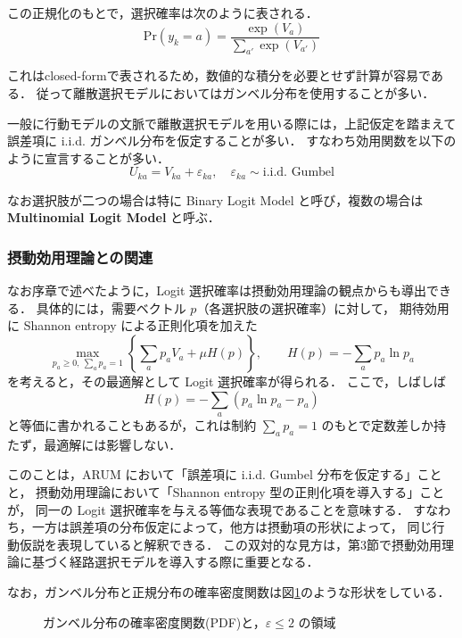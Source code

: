 この正規化のもとで，選択確率は次のように表される．
\begin{equation}
  \text{Pr}(y_k = a) = \frac{\exp(V_a)}{\sum_{a'} \exp(V_{a'})}
\end{equation}

これはclosed-formで表されるため，数値的な積分を必要とせず計算が容易である．
従って離散選択モデルにおいてはガンベル分布を使用することが多い．

一般に行動モデルの文脈で離散選択モデルを用いる際には，上記仮定を踏まえて誤差項に i.i.d. ガンベル分布を仮定することが多い．
すなわち効用関数を以下のように宣言することが多い． 
\begin{equation}
U_{ka} = V_{ka} + \varepsilon_{ka}, \quad \varepsilon_{ka} \sim \text{i.i.d. Gumbel}
\end{equation}

なお選択肢が二つの場合は特に Binary Logit Model と呼び，複数の場合は \textbf{Multinomial Logit Model} と呼ぶ．

\subsubsection{摂動効用理論との関連}
なお序章で述べたように，Logit 選択確率は摂動効用理論の観点からも導出できる．
具体的には，需要ベクトル $p$（各選択肢の選択確率）に対して，
期待効用に Shannon entropy による正則化項を加えた
\begin{equation}\label{eq:perturbed_utility}
\max_{p_a\ge 0,\ \sum_a p_a=1}
\left\{
\sum_a p_a V_a + \mu H(p)
\right\},
\qquad
H(p)=-\sum_a p_a \ln p_a
\tag{3.11}
\end{equation}
を考えると，その最適解として Logit 選択確率が得られる．
ここで，しばしば
\begin{equation}\label{eq:corrected_entropy}
  H(p)=-\sum_a (p_a\ln p_a-p_a)
\end{equation}
と等価に書かれることもあるが，これは制約 $\sum_a p_a=1$ のもとで定数差しか持たず，最適解には影響しない．

このことは，ARUM において「誤差項に i.i.d. Gumbel 分布を仮定する」ことと，
摂動効用理論において「Shannon entropy 型の正則化項を導入する」ことが，
同一の Logit 選択確率を与える等価な表現であることを意味する．
すなわち，一方は誤差項の分布仮定によって，他方は摂動項の形状によって，
同じ行動仮説を表現していると解釈できる．
この双対的な見方は，第3節で摂動効用理論に基づく経路選択モデルを導入する際に重要となる．

なお，ガンベル分布と正規分布の確率密度関数は図\ref{fig:gumbel-pdf}のような形状をしている．
\begin{figure}[hbtp]
  \centering
    \resizebox{.9\linewidth}{!}{%
    }
  \caption{ガンベル分布の確率密度関数(PDF)と，$\varepsilon \le 2$ の領域}
  \label{fig:gumbel-pdf}
\end{figure}


